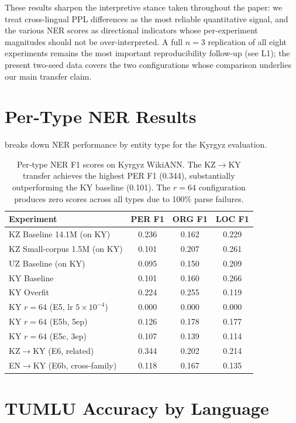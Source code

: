 \documentclass[11pt]{article}
\begin{document}
These results sharpen the interpretive stance taken throughout the paper: we treat cross-lingual PPL differences as the most reliable quantitative signal, and the various NER scores as directional indicators whose per-experiment magnitudes should not be over-interpreted. A full $n{=}3$ replication of all eight experiments remains the most important reproducibility follow-up (see L1); the present two-seed data covers the two configurations whose comparison underlies our main transfer claim.

\section{Per-Type NER Results}
\label{app:ner}

 breaks down NER performance by entity type for the Kyrgyz evaluation.

\begin{table}[t]
\centering
\small
\begin{tabular}{lccc}
\toprule
\textbf{Experiment} & \textbf{PER F1} & \textbf{ORG F1} & \textbf{LOC F1} \\
\midrule
KZ Baseline 14.1M (on KY) & 0.236 & 0.162 & 0.229 \\
KZ Small-corpus 1.5M (on KY) & 0.101 & 0.207 & 0.261 \\
UZ Baseline (on KY) & 0.095 & 0.150 & 0.209 \\
KY Baseline & 0.101 & 0.160 & 0.266 \\
KY Overfit & 0.224 & 0.255 & 0.119 \\
KY $r{=}64$ (E5, lr $5{\times}10^{-4}$) & 0.000 & 0.000 & 0.000 \\
KY $r{=}64$ (E5b, 5ep) & 0.126 & 0.178 & 0.177 \\
KY $r{=}64$ (E5c, 3ep) & 0.107 & 0.139 & 0.114 \\
KZ$\rightarrow$KY (E6, related) & 0.344 & 0.202 & 0.214 \\
EN$\rightarrow$KY (E6b, cross-family) & 0.118 & 0.167 & 0.135 \\
\bottomrule
\end{tabular}
\caption{Per-type NER F1 scores on Kyrgyz WikiANN. The KZ$\rightarrow$KY transfer achieves the highest PER F1 (0.344), substantially outperforming the KY baseline (0.101). The $r{=}64$ configuration produces zero scores across all types due to 100\% parse failures.}
\label{tab:ner_pertype}
\end{table}

\section{TUMLU Accuracy by Language}
\label{app:tumlu}
\end{document}
